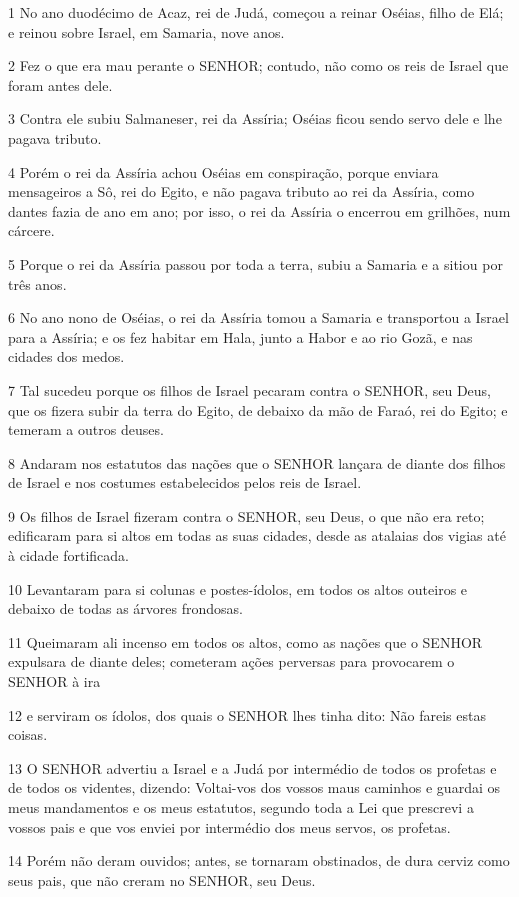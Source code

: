 \par 1 No ano duodécimo de Acaz, rei de Judá, começou a reinar Oséias, filho de Elá; e reinou sobre Israel, em Samaria, nove anos.
\par 2 Fez o que era mau perante o SENHOR; contudo, não como os reis de Israel que foram antes dele.
\par 3 Contra ele subiu Salmaneser, rei da Assíria; Oséias ficou sendo servo dele e lhe pagava tributo.
\par 4 Porém o rei da Assíria achou Oséias em conspiração, porque enviara mensageiros a Sô, rei do Egito, e não pagava tributo ao rei da Assíria, como dantes fazia de ano em ano; por isso, o rei da Assíria o encerrou em grilhões, num cárcere.
\par 5 Porque o rei da Assíria passou por toda a terra, subiu a Samaria e a sitiou por três anos.
\par 6 No ano nono de Oséias, o rei da Assíria tomou a Samaria e transportou a Israel para a Assíria; e os fez habitar em Hala, junto a Habor e ao rio Gozã, e nas cidades dos medos.
\par 7 Tal sucedeu porque os filhos de Israel pecaram contra o SENHOR, seu Deus, que os fizera subir da terra do Egito, de debaixo da mão de Faraó, rei do Egito; e temeram a outros deuses.
\par 8 Andaram nos estatutos das nações que o SENHOR lançara de diante dos filhos de Israel e nos costumes estabelecidos pelos reis de Israel.
\par 9 Os filhos de Israel fizeram contra o SENHOR, seu Deus, o que não era reto; edificaram para si altos em todas as suas cidades, desde as atalaias dos vigias até à cidade fortificada.
\par 10 Levantaram para si colunas e postes-ídolos, em todos os altos outeiros e debaixo de todas as árvores frondosas.
\par 11 Queimaram ali incenso em todos os altos, como as nações que o SENHOR expulsara de diante deles; cometeram ações perversas para provocarem o SENHOR à ira
\par 12 e serviram os ídolos, dos quais o SENHOR lhes tinha dito: Não fareis estas coisas.
\par 13 O SENHOR advertiu a Israel e a Judá por intermédio de todos os profetas e de todos os videntes, dizendo: Voltai-vos dos vossos maus caminhos e guardai os meus mandamentos e os meus estatutos, segundo toda a Lei que prescrevi a vossos pais e que vos enviei por intermédio dos meus servos, os profetas.
\par 14 Porém não deram ouvidos; antes, se tornaram obstinados, de dura cerviz como seus pais, que não creram no SENHOR, seu Deus.
